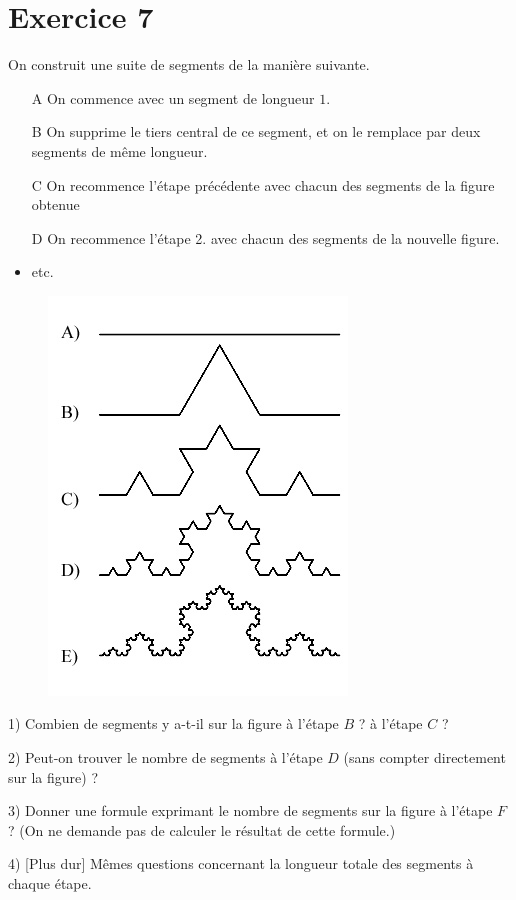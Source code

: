 \documentclass[12 pt]{article}
\theoremstyle{plain}
\newcounter{n}
\numberwithin{n}{section}
\begin{document}
\section{Exercice 7}

On construit une suite de segments de la manière suivante. \begin{itemize}
\item[A] On commence avec un segment de longueur $1$. 
\item[B] On supprime le tiers central de ce segment, et on le remplace par deux segments de même longueur.
\item[C] On recommence l'étape précédente avec chacun des segments de la figure obtenue
\item[D] On recommence l'étape 2. avec chacun des segments de la nouvelle figure. 
\item etc. 
\end{itemize}
\begin{figure}[H]\center
\includegraphics[scale=.75]{Droite_koch}
\end{figure}

1) Combien de segments y a-t-il sur la figure à l'étape $B$ ? à l'étape $C$ ? 

2) Peut-on trouver le nombre de segments à l'étape $D$ (sans compter directement sur la figure) ?

3) Donner une formule exprimant le nombre de segments sur la figure à l'étape $F$ ? (On ne demande pas de calculer le résultat de cette formule.) 

4) [Plus dur] Mêmes questions concernant la longueur totale des segments à chaque étape. 
	
\end{document}
